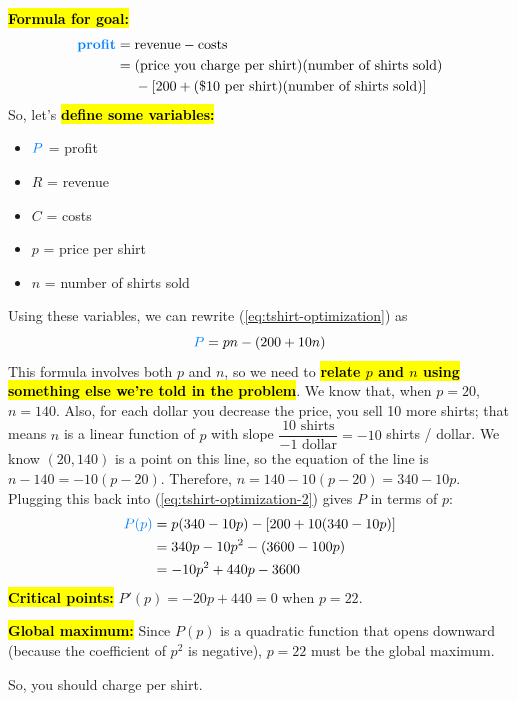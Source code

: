 \documentclass{article}
\newcommand{\highlight}[1]{\boldmath\hl{\textbf{#1}}\unboldmath}
\newcommand{\goal}[1]{\textbf{\textcolor{skyblue}{#1}}}
\theoremstyle{theorem}
\begin{document}
\begin{enumerate}
\begin{solution}
    \highlight{Formula for goal:}
    \begin{align}
      \text{\goal{profit}} = {} & \text{revenue} - \text{costs} \nonumber \\
      = {} & (\text{price you charge per shirt}) (\text{number of shirts sold}) \nonumber \\
      &- [200 + (\$10\text{ per shirt})(\text{number of shirts sold})] \label{eq:tshirt-optimization}
    \end{align}
    So, let's \highlight{define some variables:}
    \begin{itemize}[nosep]
    \item $\goal{$P$}$ = profit
    \item $R$ = revenue
    \item $C$ = costs
    \item $p$ = price per shirt
    \item $n$ = number of shirts sold
    \end{itemize}
    Using these variables, we can rewrite (\ref{eq:tshirt-optimization}) as
    \begin{equation} \label{eq:tshirt-optimization-2}
      \goal{$P$} = pn - (200 + 10n)
    \end{equation}
    This formula involves both $p$ and $n$, so we need to \highlight{relate $p$ and $n$ using something else we're told in the problem}. We know that, when $p = 20$, $n = 140$. Also, for each dollar you decrease the price, you sell 10 more shirts; that means $n$ is a linear function of $p$ with slope $\dfrac{10 \text{ shirts}}{-1 \text{ dollar}} = -10$ shirts / dollar. We know $(20, 140)$ is a point on this line, so the equation of the line is $n - 140 = -10 (p - 20)$. Therefore, $n = 140 - 10 (p - 20) = 340 - 10p$. Plugging this back into (\ref{eq:tshirt-optimization-2}) gives $P$ in terms of $p$:
    \begin{align*}
      \goal{$P(p)$} &= p (340 - 10p) - [200 + 10 (340 - 10p)] \\
      &= 340p - 10p^2 - (3600 - 100 p) \\
      &= -10 p^2 + 440p - 3600
    \end{align*}
    \highlight{Critical points:} $P'(p) = -20p + 440 = 0$ when $p = 22$.

    \highlight{Global maximum:} Since $P(p)$ is a quadratic function that opens downward (because the coefficient of $p^2$ is negative), $p = 22$ must be the global maximum.

    So, you should charge  per shirt. 
  \end{solution}


\end{enumerate}
\end{document}
